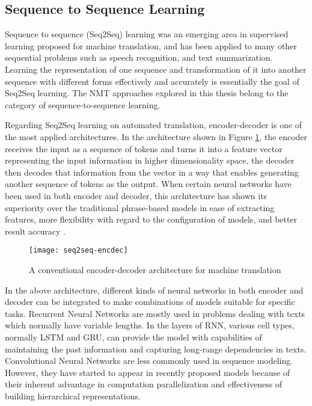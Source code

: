\subsection{Sequence to Sequence Learning} \label{subsection:seq2seq learning}
Sequence to sequence (Seq2Seq) learning \cite{Sutskever2014,Cho2014} was an emerging area in supervised learning proposed for machine translation, and has been applied to many other sequential problems such as speech recognition, and text summarization. Learning the representation of one sequence and transformation of it into another sequence with different forms effectively and accurately is essentially the goal of Seq2Seq learning. The NMT approaches explored in this thesis belong to the category of sequence-to-sequence learning.

Regarding Seq2Seq learning on automated translation, encoder-decoder is one of the most applied architectures. In the architecture shown in Figure \ref{figure:encoder-decoder}, the encoder receives the input as a sequence of tokens and turns it into a feature vector representing the input information in higher dimensionality space, the decoder then decodes that information from the vector in a way that enables generating another sequence of tokens as the output. When certain neural networks have been used in both encoder and decoder, this architecture has shown its superiority over the traditional phrase-based models in ease of extracting features, more flexibility with regard to the configuration of models, and better result accuracy \cite{Wu2016}.

\begin{figure}[h]
\texttt{[image: seq2seq-encdec]}
\centering
\caption{A conventional encoder-decoder architecture for machine translation \cite{luong17}}
\label{figure:encoder-decoder}
\end{figure}

In the above architecture, different kinds of neural networks in both encoder and decoder can be integrated to make combinations of models suitable for specific tasks. Recurrent Neural Networks are mostly used in problems dealing with texts which normally have variable lengths. In the layers of RNN, various cell types, normally LSTM and GRU, can provide the model with capabilities of maintaining the past information and capturing long-range dependencies in texts. Convolutional Neural Networks are less commonly used in sequence modeling. However, they have started to appear in recently proposed models because of their inherent advantage in computation parallelization and effectiveness of building hierarchical representations. 

